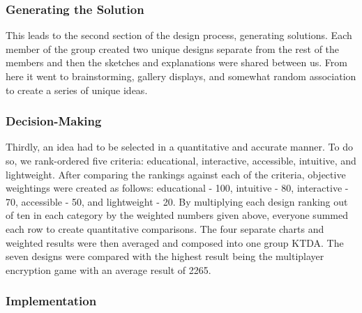 \documentclass[conference]{IEEEtran}
\begin{document}
\subsubsection{Generating the Solution}

\par This leads to the second section of the design process, generating solutions. Each member of the group created two unique designs separate from the rest of the members and then the sketches and explanations were shared between us. From here it went to brainstorming, gallery displays, and somewhat random association to create a series of unique ideas. 

\subsubsection{Decision-Making}

\par Thirdly, an idea had to be selected in a quantitative and accurate manner. To do so, we rank-ordered five criteria: educational, interactive, accessible, intuitive, and lightweight. After comparing the rankings against each of the criteria, objective weightings were created as follows: educational - 100, intuitive - 80, interactive - 70, accessible - 50, and lightweight - 20. By multiplying each design ranking out of ten in each category by the weighted numbers given above, everyone summed each row to create quantitative comparisons. The four separate charts and weighted results were then averaged and composed into one group KTDA. The seven designs were compared with the highest result being the multiplayer encryption game with an average result of 2265. 

\subsubsection{Implementation}
\end{document}
